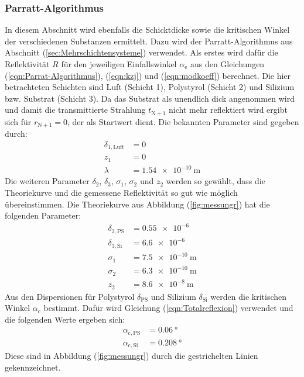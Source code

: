 \subsubsection{Parratt-Algorithmus}
In diesem Abschnitt wird ebenfalls die Schicktdicke sowie die kritischen Winkel der verschiedenen Substanzen ermittelt. Dazu wird der Parratt-Algorithmus aus Abschnitt (\ref{sec:Mehrschichtensysteme}) verwendet.
Als erstes wird dafür die Reflektivität $R$ für den jeweiligen Einfallswinkel $\alpha_\mathrm{e}$ aus den Gleichungen (\ref{eqn:Parrat-Algorithmus}), (\ref{eqn:kzj}) und (\ref{eqn:modkoeff}) berechnet.
Die hier betrachteten Schichten sind Luft (Schicht 1), Polystyrol (Schicht 2) und Silizium bzw. Substrat (Schicht 3). Da das Substrat als unendlich dick angenommen wird und damit die transmittierte Strahlung $t_\mathrm{N+1}$ nicht mehr reflektiert wird ergibt sich für $r_\mathrm{N+1}=0$, der als Startwert dient. Die bekannten Parameter sind gegeben durch:
\begin{align*}
  \delta_\mathrm{1,Luft}&=0 \\
  z_\mathrm{1}&=0 \\
  \lambda&=\SI{1.54 e-10}{\meter}
\end{align*}
Die weiteren Parameter $\delta_\mathrm{2}$, $\delta_\mathrm{3}$, $\sigma_\mathrm{1}$, $\sigma_\mathrm{2}$ und $z_\mathrm{2}$ werden so gewählt, dass die Theoriekurve und die gemessene Reflektivität so gut wie möglich übereinstimmen.
Die Theoriekurve aus Abbildung (\ref{fig:messungr}) hat die folgenden Parameter:
\begin{align*}
  \delta_\mathrm{2,PS} &=\SI{0.55 e-6}{} \\
  \delta_\mathrm{3,Si} &=\SI{6.6 e-6}{} \\
  \sigma_\mathrm{1} &=\SI{7.5 e-10}{\meter} \\
  \sigma_\mathrm{2} &=\SI{6.3 e-10}{\meter} \\
  z_\mathrm{2} &=\SI{8.6 e-8}{\meter}
\end{align*}
Aus den  Dispersionen für Polystyrol $\delta_\mathrm{PS}$ und Silizium $\delta_\mathrm{Si}$ werden die kritischen Winkel $\alpha_\mathrm{c}$ bestimmt. Dafür wird Gleichung (\ref{eqn:Totalreflexion}) verwendet und die folgenden Werte ergeben sich:
\begin{align*}
  \alpha_\mathrm{c,PS} &=\SI{0.06}{\degree} \\
  \alpha_\mathrm{c,Si} &=\SI{0.208}{\degree}
\end{align*}
Diese sind in Abbildung (\ref{fig:messungr}) durch die gestrichelten Linien gekennzeichnet.
